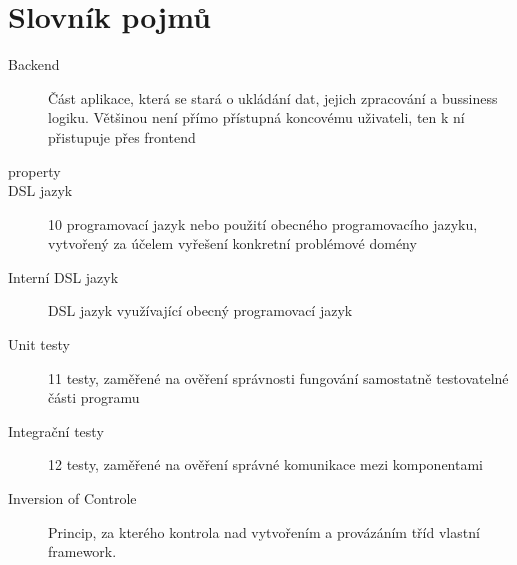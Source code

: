 \chapter{Slovník pojmů}
\begin{description} %
	\item[Backend] Část aplikace, která se stará o ukládání dat, jejich zpracování a bussiness logiku. Většinou není přímo přístupná koncovému uživateli, ten k ní přistupuje přes frontend
	\item[property]
	\item[DSL jazyk] 10 programovací jazyk nebo použití obecného programovacího jazyku, vytvořený za účelem vyřešení konkretní problémové domény
	\item[Interní DSL jazyk] DSL jazyk využívající obecný programovací jazyk
	\item[Unit testy] 11 testy, zaměřené na ověření správnosti fungování samostatně testovatelné části programu
	\item[Integrační testy] 12 testy, zaměřené na ověření správné komunikace mezi komponentami
	\item[Inversion of Controle] Princip, za kterého kontrola nad vytvořením a provázáním tříd vlastní framework. 
\end{description}